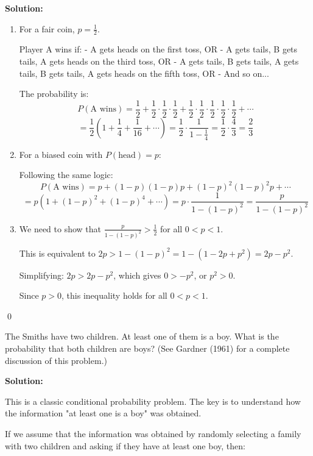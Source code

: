\noindent\textbf{Solution:}
\begin{enumerate}[label=(\alph*)]
    \item For a fair coin, $p = \frac{1}{2}$.
    
    Player A wins if:
    - A gets heads on the first toss, OR
    - A gets tails, B gets tails, A gets heads on the third toss, OR
    - A gets tails, B gets tails, A gets tails, B gets tails, A gets heads on the fifth toss, OR
    - And so on...
    
    The probability is:
    \[ P(\text{A wins}) = \frac{1}{2} + \frac{1}{2} \cdot \frac{1}{2} \cdot \frac{1}{2} + \frac{1}{2} \cdot \frac{1}{2} \cdot \frac{1}{2} \cdot \frac{1}{2} \cdot \frac{1}{2} + \cdots \]
    \[ = \frac{1}{2} \left(1 + \frac{1}{4} + \frac{1}{16} + \cdots\right) = \frac{1}{2} \cdot \frac{1}{1 - \frac{1}{4}} = \frac{1}{2} \cdot \frac{4}{3} = \frac{2}{3} \]
    
    \item For a biased coin with $P(\text{head}) = p$:
    
    Following the same logic:
    \[ P(\text{A wins}) = p + (1-p)(1-p)p + (1-p)^2(1-p)^2p + \cdots \]
    \[ = p \left(1 + (1-p)^2 + (1-p)^4 + \cdots\right) = p \cdot \frac{1}{1 - (1-p)^2} = \frac{p}{1 - (1-p)^2} \]
    
    \item We need to show that $\frac{p}{1 - (1-p)^2} > \frac{1}{2}$ for all $0 < p < 1$.
    
    This is equivalent to $2p > 1 - (1-p)^2 = 1 - (1 - 2p + p^2) = 2p - p^2$.
    
    Simplifying: $2p > 2p - p^2$, which gives $0 > -p^2$, or $p^2 > 0$.
    
    Since $p > 0$, this inequality holds for all $0 < p < 1$.
\end{enumerate}



\qed
\begin{problembox}
The Smiths have two children. At least one of them is a boy. What is the probability that both children are boys? (See Gardner (1961) for a complete discussion of this problem.)
\end{problembox}

\noindent\textbf{Solution:}

This is a classic conditional probability problem. The key is to understand how the information "at least one is a boy" was obtained.

If we assume that the information was obtained by randomly selecting a family with two children and asking if they have at least one boy, then:

